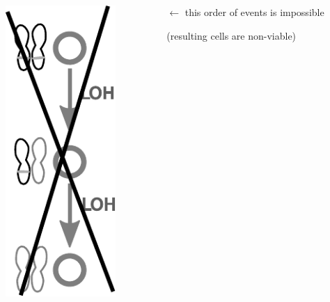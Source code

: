 \documentclass{beamer}
\begin{document}
\begin{frame}
\begin{columns}
\begin{column}{0.12\textwidth}
\begin{center}
            \includegraphics[width=0.75\textwidth]{figures/forbidden}
        \end{center}
        \end{column}
        \begin{column}{0.88\textwidth}
        $\leftarrow$ this order of events is impossible

        (resulting cells are non-viable)
        \end{column}
    \end{columns}
\end{frame}
\end{document}
